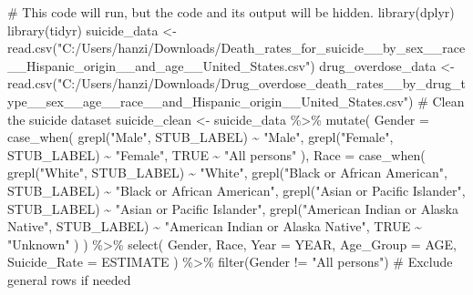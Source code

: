 \documentclass[
  letterpaper,
  DIV=11,
  numbers=noendperiod]{scrartcl}
\newenvironment{Shaded}{\begin{snugshade}}{\end{snugshade}}
\newcommand{\AttributeTok}[1]{\textcolor[rgb]{0.40,0.45,0.13}{#1}}
\newcommand{\CommentTok}[1]{\textcolor[rgb]{0.37,0.37,0.37}{#1}}
\newcommand{\ConstantTok}[1]{\textcolor[rgb]{0.56,0.35,0.01}{#1}}
\newcommand{\FunctionTok}[1]{\textcolor[rgb]{0.28,0.35,0.67}{#1}}
\newcommand{\NormalTok}[1]{\textcolor[rgb]{0.00,0.23,0.31}{#1}}
\newcommand{\OtherTok}[1]{\textcolor[rgb]{0.00,0.23,0.31}{#1}}
\newcommand{\SpecialCharTok}[1]{\textcolor[rgb]{0.37,0.37,0.37}{#1}}
\newcommand{\StringTok}[1]{\textcolor[rgb]{0.13,0.47,0.30}{#1}}
\begin{document}
\begin{Shaded}
\begin{Highlighting}[]
\CommentTok{\# This code will run, but the code and its output will be hidden.}
\FunctionTok{library}\NormalTok{(dplyr)}
\FunctionTok{library}\NormalTok{(tidyr)}
\NormalTok{suicide\_data }\OtherTok{\textless{}{-}} \FunctionTok{read.csv}\NormalTok{(}\StringTok{"C:/Users/hanzi/Downloads/Death\_rates\_for\_suicide\_\_by\_sex\_\_race\_\_Hispanic\_origin\_\_and\_age\_\_United\_States.csv"}\NormalTok{)}
\NormalTok{drug\_overdose\_data }\OtherTok{\textless{}{-}} \FunctionTok{read.csv}\NormalTok{(}\StringTok{"C:/Users/hanzi/Downloads/Drug\_overdose\_death\_rates\_\_by\_drug\_type\_\_sex\_\_age\_\_race\_\_and\_Hispanic\_origin\_\_United\_States.csv"}\NormalTok{)}
\CommentTok{\# Clean the suicide dataset}
\NormalTok{suicide\_clean }\OtherTok{\textless{}{-}}\NormalTok{ suicide\_data }\SpecialCharTok{\%\textgreater{}\%}
  \FunctionTok{mutate}\NormalTok{(}
    \AttributeTok{Gender =} \FunctionTok{case\_when}\NormalTok{(}
      \FunctionTok{grepl}\NormalTok{(}\StringTok{"Male"}\NormalTok{, STUB\_LABEL) }\SpecialCharTok{\textasciitilde{}} \StringTok{"Male"}\NormalTok{,}
      \FunctionTok{grepl}\NormalTok{(}\StringTok{"Female"}\NormalTok{, STUB\_LABEL) }\SpecialCharTok{\textasciitilde{}} \StringTok{"Female"}\NormalTok{,}
      \ConstantTok{TRUE} \SpecialCharTok{\textasciitilde{}} \StringTok{"All persons"}
\NormalTok{    ),}
    \AttributeTok{Race =} \FunctionTok{case\_when}\NormalTok{(}
      \FunctionTok{grepl}\NormalTok{(}\StringTok{"White"}\NormalTok{, STUB\_LABEL) }\SpecialCharTok{\textasciitilde{}} \StringTok{"White"}\NormalTok{,}
      \FunctionTok{grepl}\NormalTok{(}\StringTok{"Black or African American"}\NormalTok{, STUB\_LABEL) }\SpecialCharTok{\textasciitilde{}} \StringTok{"Black or African American"}\NormalTok{,}
      \FunctionTok{grepl}\NormalTok{(}\StringTok{"Asian or Pacific Islander"}\NormalTok{, STUB\_LABEL) }\SpecialCharTok{\textasciitilde{}} \StringTok{"Asian or Pacific Islander"}\NormalTok{,}
      \FunctionTok{grepl}\NormalTok{(}\StringTok{"American Indian or Alaska Native"}\NormalTok{, STUB\_LABEL) }\SpecialCharTok{\textasciitilde{}} \StringTok{"American Indian or Alaska Native"}\NormalTok{,}
      \ConstantTok{TRUE} \SpecialCharTok{\textasciitilde{}} \StringTok{"Unknown"}
\NormalTok{    )}
\NormalTok{  ) }\SpecialCharTok{\%\textgreater{}\%}
  \FunctionTok{select}\NormalTok{(}
\NormalTok{    Gender, }
\NormalTok{    Race,}
    \AttributeTok{Year =}\NormalTok{ YEAR,}
    \AttributeTok{Age\_Group =}\NormalTok{ AGE,}
    \AttributeTok{Suicide\_Rate =}\NormalTok{ ESTIMATE}
\NormalTok{  ) }\SpecialCharTok{\%\textgreater{}\%}
  \FunctionTok{filter}\NormalTok{(Gender }\SpecialCharTok{!=} \StringTok{"All persons"}\NormalTok{) }\CommentTok{\# Exclude general rows if needed}


\end{Highlighting}
\end{Shaded}
\end{document}
